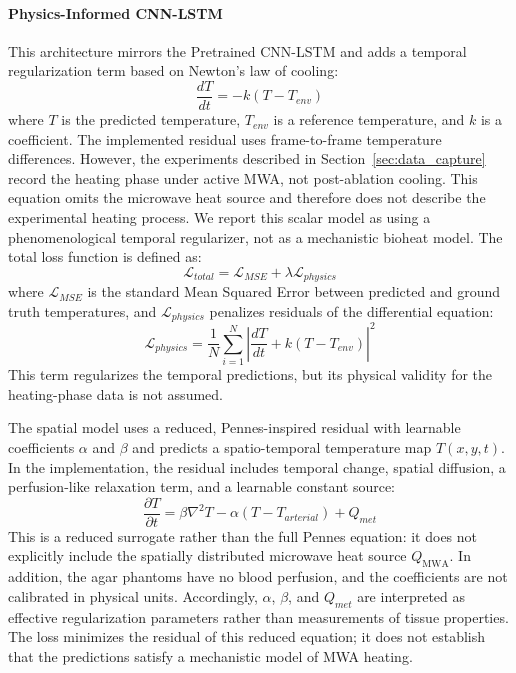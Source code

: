 \paragraph{Physics-Informed CNN-LSTM}

This architecture mirrors the Pretrained CNN-LSTM and adds a temporal regularization term based on Newton's law of cooling:
\begin{equation}
    \frac{dT}{dt} = -k(T - T_{env})
\end{equation}
where $T$ is the predicted temperature, $T_{env}$ is a reference temperature, and $k$ is a coefficient. The implemented residual uses frame-to-frame temperature differences. 
However, the experiments described in Section~\ref{sec:data_capture} record the heating phase under active MWA, not post-ablation cooling. 
This equation omits the microwave heat source and therefore does not describe the experimental heating process. 
We report this scalar model as using a phenomenological temporal regularizer, not as a mechanistic bioheat model.
The total loss function is defined as:
\begin{equation}
    \mathcal{L}_{total} = \mathcal{L}_{MSE} + \lambda \mathcal{L}_{physics}
\end{equation}
where $\mathcal{L}_{MSE}$ is the standard Mean Squared Error between predicted and ground truth temperatures, and $\mathcal{L}_{physics}$ penalizes residuals of the differential equation:
\begin{equation}
    \mathcal{L}_{physics} = \frac{1}{N} \sum_{i=1}^{N} \left| \frac{dT}{dt} + k(T - T_{env}) \right|^2
\end{equation}
This term regularizes the temporal predictions, but its physical validity for the heating-phase data is not assumed.

The spatial model uses a reduced, Pennes-inspired residual with learnable coefficients $\alpha$ and $\beta$ and predicts a spatio-temporal temperature map $T(x,y,t)$.
In the implementation, the residual includes temporal change, spatial diffusion, a perfusion-like relaxation term, and a learnable constant source:
\begin{equation}
    \frac{\partial T}{\partial t} = \beta \nabla^2 T - \alpha(T - T_{arterial}) + Q_{met}
\end{equation}
This is a reduced surrogate rather than the full Pennes equation: it does not explicitly include the spatially distributed microwave heat source $Q_{\mathrm{MWA}}$. 
In addition, the agar phantoms have no blood perfusion, and the coefficients are not calibrated in physical units. 
Accordingly, $\alpha$, $\beta$, and $Q_{met}$ are interpreted as effective regularization parameters rather than measurements of tissue properties.
The loss minimizes the residual of this reduced equation; it does not establish that the predictions satisfy a mechanistic model of MWA heating.

